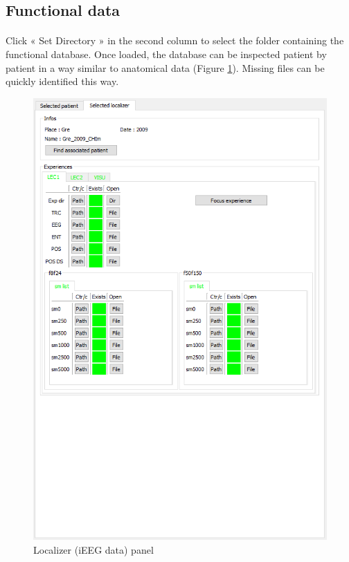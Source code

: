 \documentclass[a4paper]{article}
\begin{document}
\subsection{Functional data}
\paragraph{} Click « Set Directory » in the second column to select the folder containing the functional database. Once loaded, the database can be inspected patient by patient in a way similar to anatomical data (Figure \ref{dbManagerLoca}). Missing files can be quickly identified this way.
\begin{figure}[H]
\begin{center}
\includegraphics[scale=0.5]{DBManagerLoca.png}
\end{center}
\caption{\label{dbManagerLoca}Localizer (iEEG data) panel}
\end{figure}
\end{document}
